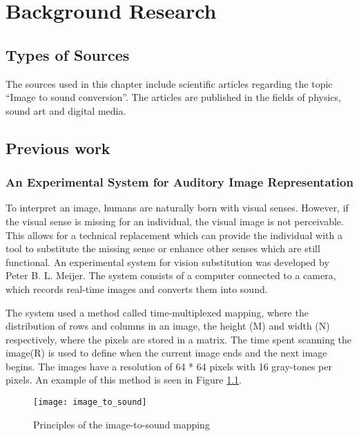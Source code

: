 \chapter{Background Research}\label{ch:bgresearch}

\section{Types of Sources}\label{sec:typesofsources} 
The sources used in this chapter include scientific articles regarding the topic “Image to sound conversion”. The articles are published in the fields of physics, sound art and digital media.

\section{Previous work}\label{sec:previouswork}

\subsection{An Experimental System for Auditory Image Representation}\label{sec:experimentalsystem}

To interpret an image, humans are naturally born with visual senses. However, if the visual sense is missing for an individual, the visual image is not perceivable. This allows for a technical replacement which can provide the individual with a tool to substitute the missing sense or enhance other senses which are still functional. An experimental system for vision substitution was developed by Peter B. L. Meijer\cite{Meijer1992}. The system consists of a computer connected to a camera, which records real-time images and converts them into sound. 

The system used a method called time-multiplexed mapping, where the distribution of rows and columns in an image, the height (M) and width (N) respectively, where the pixels are stored in a matrix. The time spent scanning the image(R) is used to define when the current image ends and the next image begins. The images have a resolution of 64 * 64 pixels with 16 gray-tones per pixels. An example of this method is seen in Figure \ref{fig:image_to_sound}. 

\begin{figure}[!h] 
\centering
\texttt{[image: image\_to\_sound]}
\caption{\label{fig:image_to_sound} Principles of the image-to-sound mapping \cite{Meijer1992}}
\end{figure}
  
